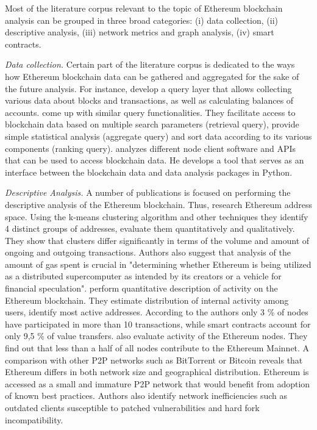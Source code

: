 Most of the literature corpus relevant to the topic of Ethereum blockchain analysis can be grouped in three broad categories: (i) data collection, (ii) descriptive analysis, (iii) network metrics and graph analysis, (iv) smart contracts.

\textit{Data collection.} Certain part of the literature corpus is dedicated to the ways how Ethereum blockchain data can be gathered and aggregated for the sake of the future analysis. For instance, 
\cite{li2017etherql} develop a query layer that allows collecting various data about blocks and transactions, as well as calculating balances of accounts.
\cite{pratama2018query} come up with similar query functionalities.
They facilitate access to blockchain data based on multiple search parameters (retrieval query), provide simple statistical analysis (aggregate query) and sort data according to its various components (ranking query).
\cite{perezanalysis} analyzes different node client software and APIs that can be used to access blockchain data.
He develops a tool that serves as an interface between the blockchain data and data analysis packages in Python.



\textit{Descriptive Analysis.} A number of publications is focused on performing the descriptive analysis of the Ethereum blockchain.
Thus, \cite{payette2017characterizing} research Ethereum address space. 
Using the k-means clustering algorithm and other techniques they identify 4 distinct groups of addresses, evaluate them quantitatively and qualitatively.
They show that clusters differ significantly in terms of the volume and amount of ongoing and outgoing transactions.
Authors also suggest that analysis of the amount of gas spent is crucial in "determining whether Ethereum is being utilized as a distributed supercomputer as intended by its creators or a vehicle for financial speculation".
\cite{anoaica2018quantitative} perform quantitative description of activity on the Ethereum blockchain. 
They 
estimate distribution of internal activity among users, identify most active addresses.
According to the authors only 3 \% of nodes have participated in more than 10 transactions, while smart contracts account for only 9,5 \% of value transfers.
\cite{kim2018measuring} also evaluate activity of the Ethereum nodes. 
They find out that less than a half of all nodes contribute to the Ethereum Mainnet. 
A comparison with other P2P networks such as BitTorrent or Bitcoin reveals that Ethereum differs in both network size and
geographical distribution. 
Ethereum is accessed as a small and immature P2P network that would benefit from adoption of known best practices.
Authors also identify network inefficiencies such as outdated clients susceptible to patched vulnerabilities and hard fork incompatibility.

